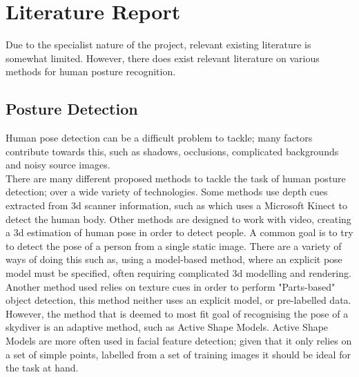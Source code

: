 \documentclass[a4paper, 12pt]{article}
\begin{document}
\section{Literature Report}
%
Due to the specialist nature of the project, relevant existing literature is somewhat limited.
However, there does exist relevant literature on various methods for human posture recognition.

\subsection{Posture Detection}
%
Human pose detection can be a difficult problem to tackle; many factors contribute towards this, such as shadows, occlusions, complicated backgrounds and noisy source images.\\
There are many different proposed methods to tackle the task of human posture detection; over a wide variety of technologies. Some methods use depth cues extracted from 3d scanner information, such as \cite{kinect_IR} which uses a Microsoft Kinect to detect the human body. Other methods are designed to work with video\cite{video}, creating a 3d estimation of human pose in order to detect people. A common goal is to try to detect the pose of a person from a single static image. There are a variety of ways of doing this such as, using a model-based method, where an explicit pose model must be specified, often requiring complicated 3d modelling and rendering\cite{model-based}. Another method used relies on texture cues in order to perform "Parts-based" object detection\cite{monocular_still_images}, this method neither uses an explicit model, or pre-labelled data.\\
However, the method that is deemed to most fit goal of recognising the pose of a skydiver is an adaptive method, such as Active Shape Models. Active Shape Models are more often used in facial feature detection\cite{cootes}\cite{face_recognition}; given that it only relies on a set of simple points, labelled from a set of training images it should be ideal for the task at hand.
%
\end{document}
